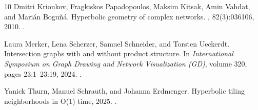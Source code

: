 \documentclass[11pt]{article}
\begin{document}
\begin{thebibliography}{10}
Dmitri Krioukov, Fragkiskos Papadopoulos, Maksim Kitsak, Amin Vahdat, and Marián Boguñá.
\newblock Hyperbolic geometry of complex networks.
, 82(3):036106, 2010.
\newblock \href {https://doi.org/10.1103/PhysRevE.82.036106} {}.

Laura Merker, Lena Scherzer, Samuel Schneider, and Torsten Ueckerdt.
\newblock Intersection graphs with and without product structure.
\newblock In {\em International Symposium on Graph Drawing and Network Visualization (GD)}, volume 320, pages 23:1--23:19, 2024.
\newblock \href {https://doi.org/10.4230/LIPIcs.GD.2024.23} {}.

Yanick Thurn, Manuel Schrauth, and Johanna Erdmenger.
\newblock Hyperbolic tiling neighborhoods in {O(1)} time, 2025.
\newblock \href {https://doi.org/10.48550/arXiv.2508.04765} {}.

\end{thebibliography}
\end{document}
